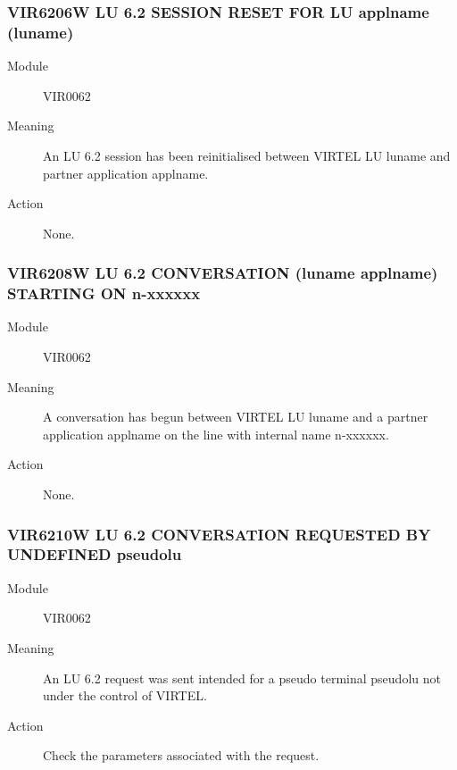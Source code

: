 \documentclass[letterpaper,10pt,english]{sphinxmanual}
\begin{document}
\subsubsection{VIR6206W LU 6.2 SESSION RESET FOR LU applname (luname)}
\label{\detokenize{messages:vir6206w-lu-6-2-session-reset-for-lu-applname-luname}}\begin{description}
\item[{Module}] \leavevmode
VIR0062

\item[{Meaning}] \leavevmode
An LU 6.2 session has been reinitialised between VIRTEL LU luname and partner application applname.

\item[{Action}] \leavevmode
None.

\end{description}


\subsubsection{VIR6208W LU 6.2 CONVERSATION (luname \textendash{} applname) STARTING ON n-xxxxxx}
\label{\detokenize{messages:vir6208w-lu-6-2-conversation-luname-applname-starting-on-n-xxxxxx}}\begin{description}
\item[{Module}] \leavevmode
VIR0062

\item[{Meaning}] \leavevmode
A conversation has begun between VIRTEL LU luname and a partner application applname on the line with internal name n-xxxxxx.

\item[{Action}] \leavevmode
None.

\end{description}


\subsubsection{VIR6210W LU 6.2 CONVERSATION REQUESTED BY UNDEFINED pseudolu}
\label{\detokenize{messages:vir6210w-lu-6-2-conversation-requested-by-undefined-pseudolu}}\begin{description}
\item[{Module}] \leavevmode
VIR0062

\item[{Meaning}] \leavevmode
An LU 6.2 request was sent intended for a pseudo terminal pseudolu not under the control of VIRTEL.

\item[{Action}] \leavevmode
Check the parameters associated with the request.

\end{description}
\end{document}
